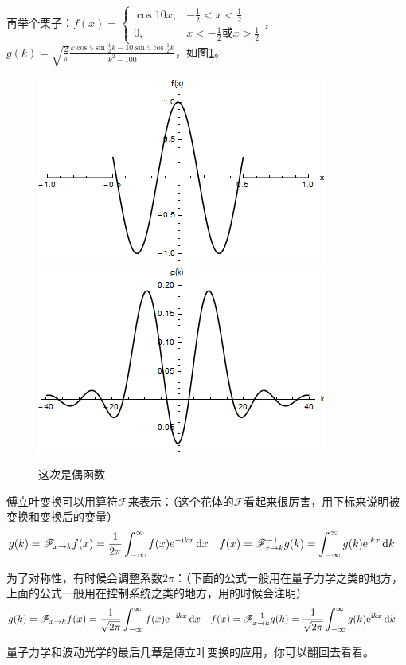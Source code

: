 再举个栗子：$f(x)=\begin{cases} \cos 10 x, &-\frac{1}{2}<x<\frac{1}{2} \\ 0, &x<-\frac{1}{2} \text{或} x>\frac{1}{2} \end{cases}$，$g(k)=\sqrt{\frac{2}{\pi}} \frac{k \cos 5 \sin \frac{1}{2} k-10 \sin 5 \cos \frac{1}{2} k}{k^2-100}$，如图\ref{fig-block-sin10x}。
\begin{figure}[htb]
\centering
\includegraphics[width=0.33\linewidth]{fig/block-sin10x.png}
\includegraphics[width=0.33\linewidth]{fig/block-sin10x-g.png}
\caption{这次是偶函数}
\label{fig-block-sin10x}
\end{figure}

傅立叶变换可以用算符$\mathscr{F}$来表示：（这个花体的$\mathscr{F}$看起来很厉害，用下标来说明被变换和变换后的变量）
\begin{align*}
g(k)&=\mathscr{F}_{x \rightarrow k} f(x)=\frac{1}{2 \pi} \int_{-\infty}^{\infty} f(x) \mathrm{e}^{-\mathrm{i} k x} \mathop{}\!\mathrm{d} x &
f(x)&=\mathscr{F}^{-1}_{x \rightarrow k} g(k)=\int_{-\infty}^{\infty} g(k) \mathrm{e}^{\mathrm{i} k x} \mathop{}\!\mathrm{d} k
\end{align*}

为了对称性，有时候会调整系数$2 \pi$：（下面的公式一般用在量子力学之类的地方，上面的公式一般用在控制系统之类的地方，用的时候会注明）
\begin{align*}
g(k)&=\mathscr{F}_{x \rightarrow k} f(x)=\frac{1}{\sqrt{2 \pi}} \int_{-\infty}^{\infty} f(x) \mathrm{e}^{-\mathrm{i} k x} \mathop{}\!\mathrm{d} x &
f(x)&=\mathscr{F}^{-1}_{x \rightarrow k} g(k)=\frac{1}{\sqrt{2 \pi}} \int_{-\infty}^{\infty} g(k) \mathrm{e}^{\mathrm{i} k x} \mathop{}\!\mathrm{d} k
\end{align*}

量子力学和波动光学的最后几章是傅立叶变换的应用，你可以翻回去看看。
